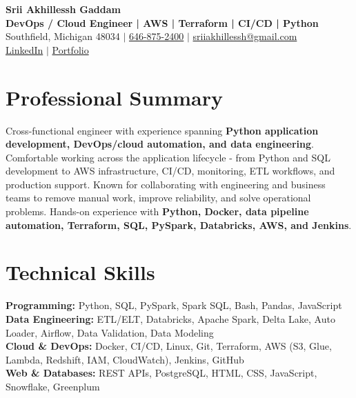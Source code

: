 \documentclass[letterpaper,10pt]{article}
\begin{document}
\fontsize{9.35pt}{10.45pt}\selectfont

\begin{center}
    {\LARGE \textbf{Srii Akhillessh Gaddam}} \\[-1pt]
    \textbf{DevOps / Cloud Engineer | AWS | Terraform | CI/CD | Python} \\[2pt]
    Southfield, Michigan 48034 $|$
    \href{tel:6468752400}{646-875-2400} $|$
    \href{mailto:sriiakhillessh@gmail.com}{sriiakhillessh@gmail.com} \\[1pt]
    \href{https://www.linkedin.com/in/srii-akhiilessh-gaddam-b48668191/}{LinkedIn} $|$
    \href{https://sriiakhillesshg.github.io/portfolio/}{Portfolio}
\end{center}
\vspace{-8pt}

\section{Professional Summary}
\small{Cross-functional engineer with experience spanning \textbf{Python application development, DevOps/cloud automation, and data engineering}. Comfortable working across the application lifecycle - from Python and SQL development to AWS infrastructure, CI/CD, monitoring, ETL workflows, and production support. Known for collaborating with engineering and business teams to remove manual work, improve reliability, and solve operational problems. Hands-on experience with \textbf{Python, Docker, data pipeline automation, Terraform, SQL, PySpark, Databricks, AWS, and Jenkins}.}

\section{Technical Skills}
\small{
\textbf{Programming:} Python, SQL, PySpark, Spark SQL, Bash, Pandas, JavaScript \\
\textbf{Data Engineering:} ETL/ELT, Databricks, Apache Spark, Delta Lake, Auto Loader, Airflow, Data Validation, Data Modeling \\
\textbf{Cloud \& DevOps:} Docker, CI/CD, Linux, Git, Terraform, AWS (S3, Glue, Lambda, Redshift, IAM, CloudWatch), Jenkins, GitHub \\
\textbf{Web \& Databases:} REST APIs, PostgreSQL, HTML, CSS, JavaScript, Snowflake, Greenplum
}
\end{document}
